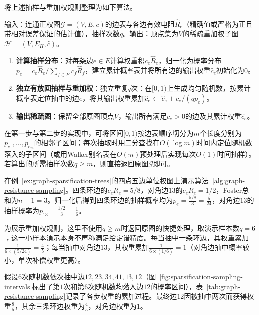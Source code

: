 将上述抽样与重加权规则整理为如下算法。

\begin{algorithm}[按有效电阻抽样构造稀疏图]
\label{alg:graph-resistance-sampling}
输入：连通正权图$\mathcal G=(V,E,c)$的边表与各边有效电阻$\widehat R_e$（精确值或严格为正且带相对误差保证的估计值），抽样次数$q$。输出：顶点集为$V$的稀疏重加权子图$\mathcal H=(V,E_H,\widehat c)$。
\begin{enumerate}
  \item \textbf{计算抽样分布}：对每条边$e\in E$计算权重积$c_e\widehat R_e$，归一化为概率分布$p_e=c_e\widehat R_e/\sum_{f\in E}c_f\widehat R_f$，建立累计概率表并将所有边的输出权重$\widehat c_e$初始化为$0$。
  \item \textbf{独立有放回抽样与重加权}：独立重复$q$次：在$[0,1)$上生成均匀随机数，按累计概率表定位抽中的边$e$，将其输出权重累加$\widehat c_e\leftarrow\widehat c_e+c_e/(qp_e)$。
  \item \textbf{输出稀疏图}：保留全部原图顶点$V$，输出所有满足$\widehat c_e>0$的边及其累计权重$\widehat c_e$。
\end{enumerate}
\end{algorithm}

在第一步与第二步的实现中，可将区间$[0,1)$按边表顺序切分为$m$个长度分别为$p_{e_1},\ldots,p_{e_m}$的相邻子区间；每次抽取时用二分查找在$O(\log m)$时间内定位随机数落入的子区间（或用Walker别名表在$O(m)$预处理后实现每次$O(1)$时间抽样）。若算出的所需抽样次数$q\geq m$，则直接返回原图$\mathcal G$即可。

\begin{example}[四点五边图上的有效电阻抽样与重加权过程]
\label{ex:graph-resistance-sampling}
在例~\ref{ex:graph-sparsification-trees}的四点五边单位权图上演示算法~\ref{alg:graph-resistance-sampling}。四条环边的$c_e R_e=5/8$，对角边$13$的$c_e R_e=1/2$，Foster总和为$n-1=3$。归一化后得到四条环边的抽样概率均为$p_e=\frac{5/8}{3}=\frac{5}{24}$，对角边$13$的抽样概率为$p_{13}=\frac{1/2}{3}=\frac{1}{6}$。

为展示重加权规则，这里不使用$q\geq m$时返回原图的快捷处理，取演示样本数$q=6$；这一小样本演示本身不声称满足给定谱精度。每当抽中一条环边，其权重累加$\frac{1}{6\times(5/24)}=\frac{4}{5}$；每当抽中对角边$13$，其权重累加$\frac{1}{6\times(1/6)}=1$（对角边抽中概率较小，单次补偿权重更高）。

假设$6$次随机数依次抽中边$12,23,34,41,13,12$（图~\ref{fig:sparsification-sampling-intervals}标出了第$1$次和第$6$次随机数均落入边$12$的概率区间），表~\ref{tab:graph-resistance-sampling}记录了各步权重的累加过程。最终边$12$因被抽中两次而获得权重$\frac85$，其余三条环边权重为$\frac45$，对角边权重为$1$。
\end{example}

